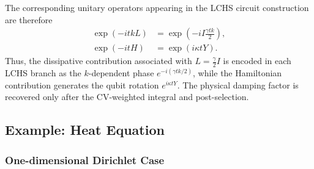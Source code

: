 \documentclass{article}
\begin{document}
The corresponding unitary operators appearing in the LCHS circuit construction are therefore
\begin{align}
    \exp(-i t k L)
    &=
    \exp\!\left(
    - i I \frac{\gamma t k}{2}
    \right), \\
    \exp(-i t H)
    &=
    \exp\!\left(
    i \kappa t Y
    \right).
\end{align}
Thus, the dissipative contribution associated with $L = \frac{\gamma}{2} I$ is encoded in each LCHS branch as the $k$-dependent phase $e^{-i(\gamma t k/2)}$, while the Hamiltonian contribution generates the qubit rotation $e^{i \kappa t Y}$. The physical damping factor is recovered only after the CV-weighted integral and post-selection.






\subsection{Example: Heat Equation}
\subsubsection{One-dimensional Dirichlet Case}
\label{1d-heat}
\end{document}
